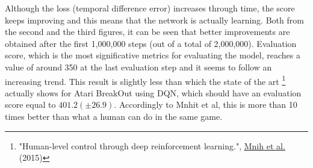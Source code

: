 \documentclass[12pt]{article}
\begin{document}
Although the loss (temporal difference error) increases through time, the score keeps improving and this means that the network is actually learning. Both from the second and the third figures, it can be seen that better improvements are obtained after the first 1,000,000 steps (out of a total of 2,000,000). Evaluation score, which is the most significative metrics for evaluating the model, reaches a value of around 350 at the last evaluation step and it seems to follow an increasing trend. This result is slightly less than which the state of the art \footnote{"Human-level control through deep reinforcement learning.", \href{https://web.stanford.edu/class/psych209/Readings/MnihEtAlHassibis15NatureControlDeepRL.pdf}{Mnih et al.} (2015)} actually shows for Atari BreakOut using DQN, which should have an evaluation score equal to $401.2 (\pm 26.9)$. Accordingly to Mnhit et al, this is more than 10 times better than what a human can do in the same game.
\end{document}
